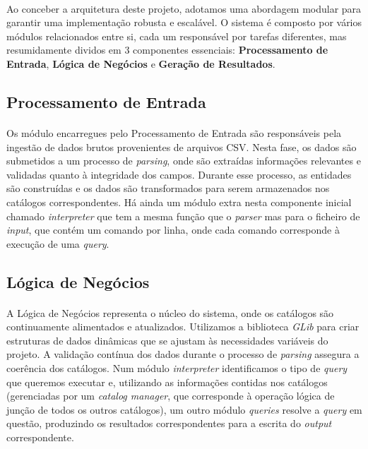 \documentclass{article}
\begin{document}
\paragraph{}Ao conceber a arquitetura deste projeto, adotamos uma abordagem modular para garantir uma implementação robusta e escalável. O sistema é composto por vários módulos relacionados entre si, cada um responsável por tarefas diferentes, mas resumidamente dividos em 3 componentes essenciais: \textbf{Processamento de Entrada}, \textbf{Lógica de Negócios} e \textbf{Geração de Resultados}.

\subsection{Processamento de Entrada}
\paragraph{}Os módulo encarregues pelo Processamento de Entrada são responsáveis pela ingestão de dados brutos provenientes de arquivos CSV. Nesta fase, os dados são submetidos a um processo de \textit{parsing}, onde são extraídas informações relevantes e validadas quanto à integridade dos campos. Durante esse processo, as entidades são construídas e os dados são transformados para serem armazenados nos catálogos correspondentes. Há ainda um módulo extra nesta componente inicial chamado \textit{interpreter} que tem a mesma função que o \textit{parser} mas para o ficheiro de \textit{input}, que contém um comando por linha, onde cada comando corresponde à execução de uma \textit{query}.

\subsection{Lógica de Negócios}
\paragraph{}A Lógica de Negócios representa o núcleo do sistema, onde os catálogos são continuamente alimentados e atualizados. Utilizamos a biblioteca \textit{GLib} para criar estruturas de dados dinâmicas que se ajustam às necessidades variáveis do projeto. A validação contínua dos dados durante o processo de \textit{parsing} assegura a coerência dos catálogos. 
Num módulo \textit{interpreter} identificamos o tipo de \textit{query} que queremos executar e, utilizando as informações contidas nos catálogos (gerenciadas por um \textit{catalog manager}, que corresponde à operação lógica de junção de todos os outros catálogos), um outro módulo \textit{queries} resolve a \textit{query} em questão, produzindo os resultados correspondentes para a escrita do \textit{output} correspondente.
\end{document}
